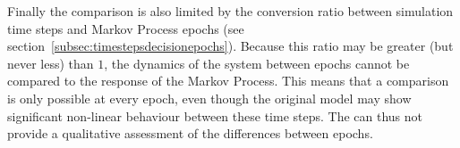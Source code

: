 Finally the comparison is also limited by the conversion ratio between simulation time steps and Markov Process epochs (see section~\ref{subsec:timestepsdecisionepochs}). Because this ratio may be greater (but never less) than $1$, the dynamics of the system between epochs cannot be compared to the response of the Markov Process. This means that a comparison is only possible at every epoch, even though the original model may show significant non-linear behaviour between these time steps. The  can thus not provide a qualitative assessment of the differences between epochs.











